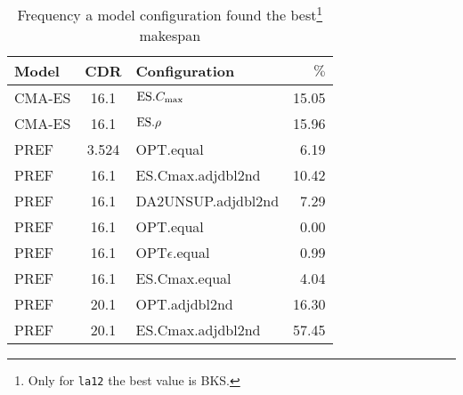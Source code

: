 \begin{table}
  \noindent
  \begin{minipage}{\textwidth}
  \caption[Frequency of finding best makespan]{Frequency a model configuration 
  found the best\footnote{Only for \texttt{la12} the best value is BKS.} 
  makespan}
  \centering
  \begin{tabular}{lclr}
    \toprule
    Model & CDR & Configuration & $\%$ \\ 
    \midrule
    CMA-ES & 16.1 & $\text{ES}.{C_{\max}}$ & 15.05 \\ 
    CMA-ES & 16.1 & $\text{ES}.{\rho}$ & 15.96 \\ 
    \midrule
    PREF & 3.524 & OPT.equal & 6.19 \\ 
    PREF & 16.1 & ES.Cmax.adjdbl2nd & 10.42 \\ 
    PREF & 16.1 & DA2UNSUP.adjdbl2nd & 7.29 \\ 
    PREF & 16.1 & OPT.equal & 0.00 \\ 
    PREF & 16.1 & OPT$\epsilon$.equal & 0.99 \\ 
    PREF & 16.1 & ES.Cmax.equal & 4.04 \\ 
    \midrule
    PREF & 20.1 & OPT.adjdbl2nd & 16.30 \\ 
    PREF & 20.1 & ES.Cmax.adjdbl2nd & 57.45 \\ 
    \bottomrule
  \end{tabular}
  \end{minipage}
\end{table}

